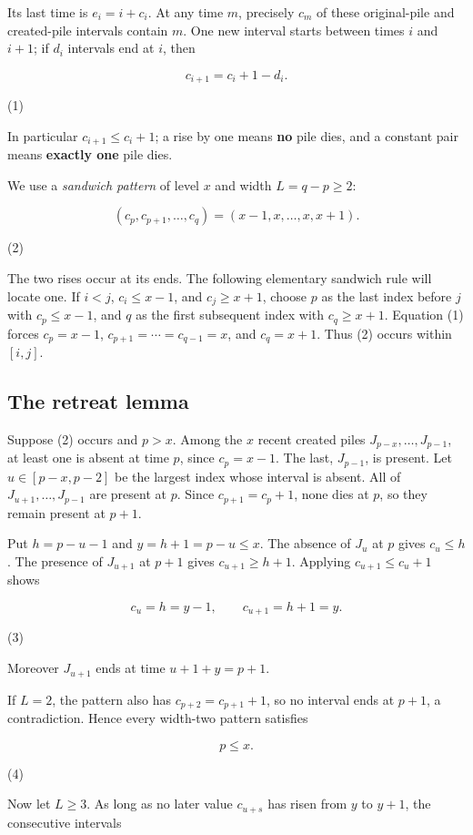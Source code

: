 \documentclass[11pt,a4paper]{article}
\begin{document}
Its last time is $e_i=i+c_i$. At any time $m$, precisely $c_m$ of these original-pile and created-pile intervals contain $m$. One new interval starts between times $i$ and $i+1$; if $d_i$ intervals end at $i$, then

\[
c_{i+1}=c_i+1-d_i.
\]

(1)

In particular $c_{i+1}\le c_i+1$; a rise by one means \textbf{no} pile dies, and a constant pair means \textbf{exactly one} pile dies.

We use a \emph{sandwich pattern} of level $x$ and width $L=q-p\ge2$:

\[
(c_p,c_{p+1},\ldots,c_q)=(x-1,x,\ldots,x,x+1).
\]

(2)

The two rises occur at its ends. The following elementary sandwich rule will locate one. If $i<j$, $c_i\le x-1$, and $c_j\ge x+1$, choose $p$ as the last index before $j$ with $c_p\le x-1$, and $q$ as the first subsequent index with $c_q\ge x+1$. Equation (1) forces $c_p=x-1$, $c_{p+1}=\cdots=c_{q-1}=x$, and $c_q=x+1$. Thus (2) occurs within $[i,j]$.

\subsection{The retreat lemma}

Suppose (2) occurs and $p>x$. Among the $x$ recent created piles $J_{p-x},\ldots,J_{p-1}$, at least one is absent at time $p$, since $c_p=x-1$. The last, $J_{p-1}$, is present. Let $u\in[p-x,p-2]$ be the largest index whose interval is absent. All of $J_{u+1},\ldots,J_{p-1}$ are present at $p$. Since $c_{p+1}=c_p+1$, none dies at $p$, so they remain present at $p+1$.

Put $h=p-u-1$ and $y=h+1=p-u\le x$. The absence of $J_u$ at $p$ gives $c_u\le h$. The presence of $J_{u+1}$ at $p+1$ gives $c_{u+1}\ge h+1$. Applying $c_{u+1}\le c_u+1$ shows

\[
c_u=h=y-1,\qquad c_{u+1}=h+1=y.
\]

(3)

Moreover $J_{u+1}$ ends at time $u+1+y=p+1$.

If $L=2$, the pattern also has $c_{p+2}=c_{p+1}+1$, so no interval ends at $p+1$, a contradiction. Hence every width-two pattern satisfies

\[
p\le x.
\]

(4)

Now let $L\ge3$. As long as no later value $c_{u+s}$ has risen from $y$ to $y+1$, the consecutive intervals
\end{document}
